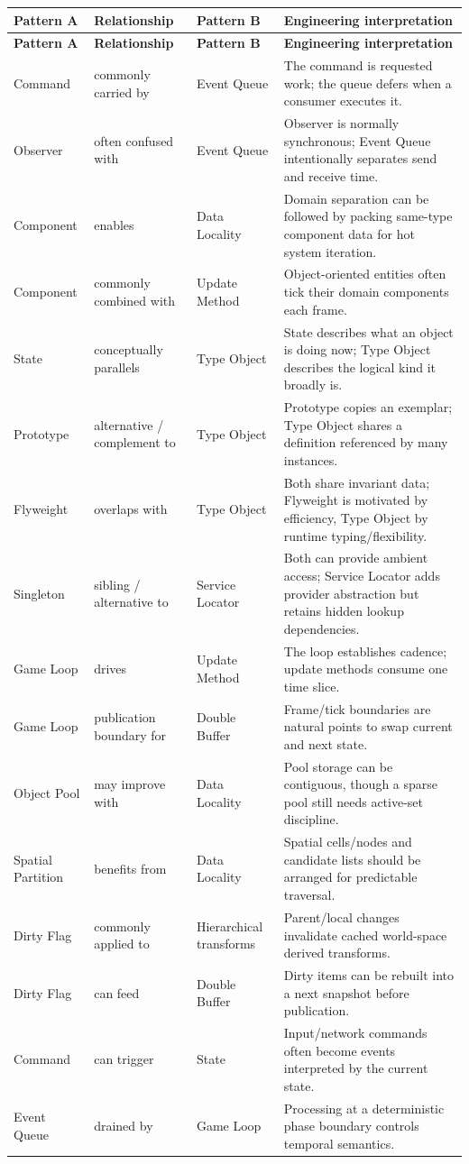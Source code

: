 \documentclass[11pt]{article}
\begin{document}
\begin{longtable}{P{2.6cm}P{2.8cm}P{2.6cm}P{6.2cm}}
\toprule
\textbf{Pattern A} & \textbf{Relationship} & \textbf{Pattern B} & \textbf{Engineering interpretation}\\
\midrule
\endfirsthead
\toprule
\textbf{Pattern A} & \textbf{Relationship} & \textbf{Pattern B} & \textbf{Engineering interpretation}\\
\midrule
\endhead
Command & commonly carried by & Event Queue & The command is requested work; the queue defers when a consumer executes it.\\
Observer & often confused with & Event Queue & Observer is normally synchronous; Event Queue intentionally separates send and receive time.\\
Component & enables & Data Locality & Domain separation can be followed by packing same-type component data for hot system iteration.\\
Component & commonly combined with & Update Method & Object-oriented entities often tick their domain components each frame.\\
State & conceptually parallels & Type Object & State describes what an object is doing now; Type Object describes the logical kind it broadly is.\\
Prototype & alternative / complement to & Type Object & Prototype copies an exemplar; Type Object shares a definition referenced by many instances.\\
Flyweight & overlaps with & Type Object & Both share invariant data; Flyweight is motivated by efficiency, Type Object by runtime typing/flexibility.\\
Singleton & sibling / alternative to & Service Locator & Both can provide ambient access; Service Locator adds provider abstraction but retains hidden lookup dependencies.\\
Game Loop & drives & Update Method & The loop establishes cadence; update methods consume one time slice.\\
Game Loop & publication boundary for & Double Buffer & Frame/tick boundaries are natural points to swap current and next state.\\
Object Pool & may improve with & Data Locality & Pool storage can be contiguous, though a sparse pool still needs active-set discipline.\\
Spatial Partition & benefits from & Data Locality & Spatial cells/nodes and candidate lists should be arranged for predictable traversal.\\
Dirty Flag & commonly applied to & Hierarchical transforms & Parent/local changes invalidate cached world-space derived transforms.\\
Dirty Flag & can feed & Double Buffer & Dirty items can be rebuilt into a next snapshot before publication.\\
Command & can trigger & State & Input/network commands often become events interpreted by the current state.\\
Event Queue & drained by & Game Loop & Processing at a deterministic phase boundary controls temporal semantics.\\
\bottomrule
\end{longtable}
\end{document}
